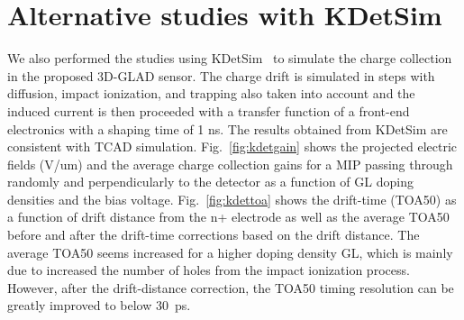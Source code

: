 \documentclass[aps,pt14,superscriptaddress,showpacs,floatfix,nofootinbib]{revtex4}
\begin{document}
\section{Alternative studies with KDetSim} 

We also performed the studies using KDetSim~\cite{kdetsim} to simulate the charge collection in the proposed 3D-GLAD sensor.
The charge drift is simulated in steps with diffusion, impact ionization, and trapping also taken into account and  
the induced current is then proceeded with a transfer function of a front-end electronics with a shaping time of 1 ns. 
The results obtained from KDetSim are consistent with TCAD simulation. Fig.~\ref{fig:kdetgain} shows the projected 
electric fields (V/um) and the average charge collection gains for a MIP passing through randomly and perpendicularly 
to the detector as a function of GL doping densities and the bias voltage. Fig.~\ref{fig:kdettoa} shows the drift-time 
(TOA50) as a function of drift distance from the n+ electrode as well as the average TOA50 before and after the drift-time 
corrections based on the drift distance. The average TOA50 seems increased for a higher doping density GL, which is mainly 
due to increased the number of holes from the impact ionization process. However, after the drift-distance correction, the 
TOA50 timing resolution can be greatly improved to below 30~ps.  
     
\end{document}
